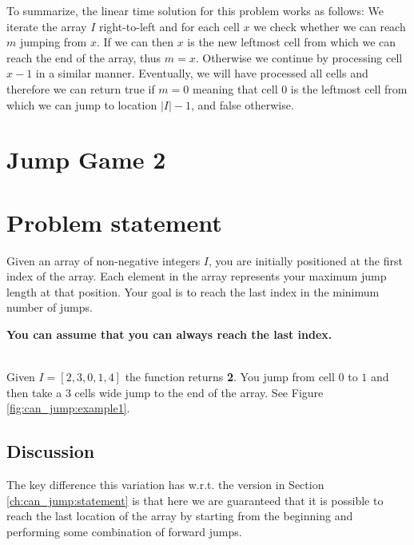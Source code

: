 To summarize,  the linear time solution for this problem works as follows: We iterate the array $I$
right-to-left and for each cell $x$ we check whether we can reach $m$ jumping from $x$. If we can
then $x$ is the new leftmost cell from which we can reach the end of the array, thus $m = x$.
Otherwise we continue by processing cell $x-1$ in a similar manner. Eventually, we will have
processed all cells and therefore we can return true if $m = 0$ meaning that cell $0$ is the
leftmost cell from which we can jump to location $|I|-1$, and false otherwise.



\section{Jump Game 2}

\section{Problem statement}
\label{can_jump1:sec:statement}
\begin{exercise}
    Given an array of non-negative integers $I$, you are initially positioned at the first index of the array.
    Each element in the array represents your maximum jump length at that position.
    Your goal is to reach the last index in the minimum number of jumps.    
    
    \textbf{You can assume that you can always reach the last index.}
    \begin{example}
        \hfill \\
        Given  $I=[2,3,0,1,4]$ the function returns \textbf{2}. You jump from cell $0$ to $1$ and
        then take a $3$ cells wide jump to the end of the array. See Figure
        \ref{fig:can_jump:example1}.
        \label{ex:can_jump2_example1}
    \end{example}
\end{exercise}

\subsection{Discussion}
The key difference this variation has w.r.t. the version in Section \ref{ch:can_jump:statement} is that here we are guaranteed that it is possible to reach the last location of the array by starting from the beginning and performing some combination of forward jumps. 

